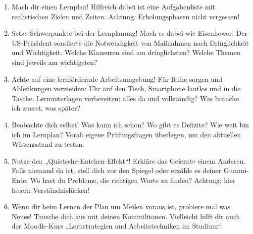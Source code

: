 \begin{enumerate}
\item Mach dir einen Lernplan! Hilfreich dabei ist eine Aufgabenliste mit realistischen Zielen und Zeiten. Achtung: Erholungsphasen nicht vergessen!

\item Setze Schwerpunkte bei der Lernplanung! Mach es dabei wie Eisenhower: Der US-Präsident sondierte die Notwendigkeit von Maßnahmen nach Dringlichkeit und Wichtigkeit. Welche Klausuren sind am dringlichsten? Welche Themen sind jeweils am wichtigsten?

\item Achte auf eine lernfördernde Arbeitsumgebung! Für Ruhe sorgen und Ablenkungen vermeiden: Uhr auf den Tisch, Smartphone lautlos und in die Tasche. Lernunterlagen vorbereiten: alles da und vollständig? Was brauche ich zuerst, was später?

\item Beobachte dich selbst! Was kann ich schon? Wo gibt es Defizite? Wie weit bin ich im Lernplan? Vorab eigene Prüfungsfragen überlegen, um den aktuellen Wissensstand zu testen.

\item Nutze den „Quietsche-Entchen-Effekt“! Erkläre das Gelernte einem Anderen. Falls niemand da ist, stell dich vor den Spiegel oder erzähle es deiner Gummi-Ente. Wo hast du Probleme, die richtigen Worte zu finden? Achtung: hier lauern Verständnislücken!

\item Wenn dir beim Lernen der Plan um Meilen voraus ist, probiere mal was Neues! Tausche dich aus mit deinen Kommilitonen. Vielleicht hilft dir auch der Moodle-Kurs „Lernstrategien und Arbeitstechniken im Studium“.

\end{enumerate}